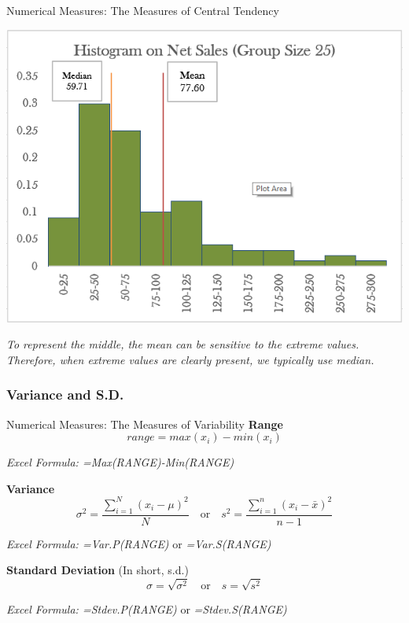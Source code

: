 \documentclass{beamer}
\begin{document}
\begin{frame}{Numerical Measures: The Measures of Central Tendency}
\begin{center}
\includegraphics[scale=0.5]{images/ch2MeanMedian.png}

\textit{To represent the middle, the mean can be sensitive to the extreme values. Therefore, when extreme values are clearly present, we typically use median.}

\end{center}
\end{frame}






\subsubsection{Variance and S.D.}
\begin{frame}{Numerical Measures: The Measures of Variability}
\textbf{Range}
$$range = max(x_i) - min(x_i)$$

\begin{flushright}

\textit{Excel Formula: 
=Max(RANGE)-Min(RANGE)}

\end{flushright}


\textbf{Variance}
$$  \sigma^2 = \frac{\sum_{i=1}^N(x_i - \mu)^2}{N} \quad\text{or}\quad  s^2 = \frac{\sum_{i=1}^n(x_i - \bar{x})^2}{n-1}  $$

\begin{flushright}

\textit{Excel Formula: 
=Var.P(RANGE)}  or  \textit{=Var.S(RANGE)}

\end{flushright}


\textbf{Standard Deviation} (In short, s.d.)
$$ \sigma = \sqrt{\sigma^2} \quad\text{or}\quad s = \sqrt{s^2}$$

\begin{flushright}

\textit{Excel Formula: 
=Stdev.P(RANGE)} or \textit{=Stdev.S(RANGE)}

\end{flushright}


\end{frame}
\end{document}
